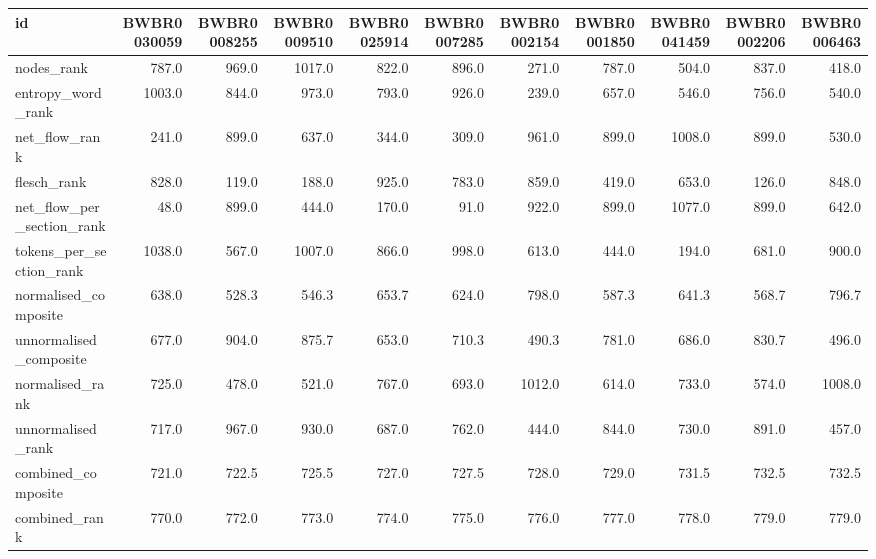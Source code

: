 \begin{tabular}{lrrrrrrrrrr}
\toprule
id & BWBR0030059 & BWBR0008255 & BWBR0009510 & BWBR0025914 & BWBR0007285 & BWBR0002154 & BWBR0001850 & BWBR0041459 & BWBR0002206 & BWBR0006463 \\
\midrule
nodes\_rank & 787.0 & 969.0 & 1017.0 & 822.0 & 896.0 & 271.0 & 787.0 & 504.0 & 837.0 & 418.0 \\
\cline{1-11}
entropy\_word\_rank & 1003.0 & 844.0 & 973.0 & 793.0 & 926.0 & 239.0 & 657.0 & 546.0 & 756.0 & 540.0 \\
\cline{1-11}
net\_flow\_rank & 241.0 & 899.0 & 637.0 & 344.0 & 309.0 & 961.0 & 899.0 & 1008.0 & 899.0 & 530.0 \\
\cline{1-11}
flesch\_rank & 828.0 & 119.0 & 188.0 & 925.0 & 783.0 & 859.0 & 419.0 & 653.0 & 126.0 & 848.0 \\
\cline{1-11}
net\_flow\_per\_section\_rank & 48.0 & 899.0 & 444.0 & 170.0 & 91.0 & 922.0 & 899.0 & 1077.0 & 899.0 & 642.0 \\
\cline{1-11}
tokens\_per\_section\_rank & 1038.0 & 567.0 & 1007.0 & 866.0 & 998.0 & 613.0 & 444.0 & 194.0 & 681.0 & 900.0 \\
\cline{1-11}
normalised\_composite & 638.0 & 528.3 & 546.3 & 653.7 & 624.0 & 798.0 & 587.3 & 641.3 & 568.7 & 796.7 \\
\cline{1-11}
unnormalised\_composite & 677.0 & 904.0 & 875.7 & 653.0 & 710.3 & 490.3 & 781.0 & 686.0 & 830.7 & 496.0 \\
\cline{1-11}
normalised\_rank & 725.0 & 478.0 & 521.0 & 767.0 & 693.0 & 1012.0 & 614.0 & 733.0 & 574.0 & 1008.0 \\
\cline{1-11}
unnormalised\_rank & 717.0 & 967.0 & 930.0 & 687.0 & 762.0 & 444.0 & 844.0 & 730.0 & 891.0 & 457.0 \\
\cline{1-11}
combined\_composite & 721.0 & 722.5 & 725.5 & 727.0 & 727.5 & 728.0 & 729.0 & 731.5 & 732.5 & 732.5 \\
\cline{1-11}
combined\_rank & 770.0 & 772.0 & 773.0 & 774.0 & 775.0 & 776.0 & 777.0 & 778.0 & 779.0 & 779.0 \\
\cline{1-11}
\bottomrule
\end{tabular}
